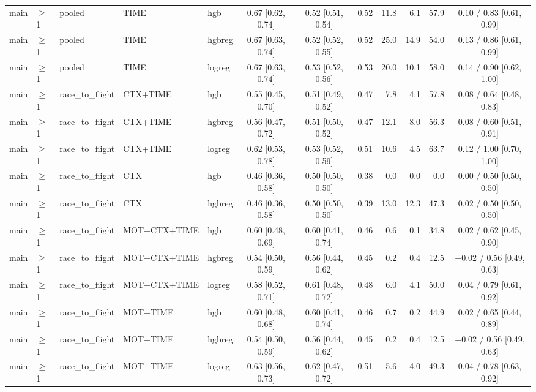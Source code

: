 \begin{longtable}{@{}lllllcccrrrc@{}}
main & $\geq$1 & pooled & TIME & hgb & 0.67 [0.62, 0.74] & 0.52 [0.51, 0.54] & 0.52 & 11.8 & 6.1 & 57.9 & 0.10 / 0.83 [0.61, 0.99] \\
main & $\geq$1 & pooled & TIME & hgbreg & 0.67 [0.63, 0.74] & 0.52 [0.52, 0.55] & 0.52 & 25.0 & 14.9 & 54.0 & 0.13 / 0.86 [0.61, 0.99] \\
main & $\geq$1 & pooled & TIME & logreg & 0.67 [0.63, 0.74] & 0.53 [0.52, 0.56] & 0.53 & 20.0 & 10.1 & 58.0 & 0.14 / 0.90 [0.62, 1.00] \\
main & $\geq$1 & race\_to\_flight & CTX+TIME & hgb & 0.55 [0.45, 0.70] & 0.51 [0.49, 0.52] & 0.47 & 7.8 & 4.1 & 57.8 & 0.08 / 0.64 [0.48, 0.83] \\
main & $\geq$1 & race\_to\_flight & CTX+TIME & hgbreg & 0.56 [0.47, 0.72] & 0.51 [0.50, 0.52] & 0.47 & 12.1 & 8.0 & 56.3 & 0.08 / 0.60 [0.51, 0.91] \\
main & $\geq$1 & race\_to\_flight & CTX+TIME & logreg & 0.62 [0.53, 0.78] & 0.53 [0.52, 0.59] & 0.51 & 10.6 & 4.5 & 63.7 & 0.12 / 1.00 [0.70, 1.00] \\
main & $\geq$1 & race\_to\_flight & CTX & hgb & 0.46 [0.36, 0.58] & 0.50 [0.50, 0.50] & 0.38 & 0.0 & 0.0 & 0.0 & 0.00 / 0.50 [0.50, 0.50] \\
main & $\geq$1 & race\_to\_flight & CTX & hgbreg & 0.46 [0.36, 0.58] & 0.50 [0.50, 0.50] & 0.39 & 13.0 & 12.3 & 47.3 & 0.02 / 0.50 [0.50, 0.50] \\
main & $\geq$1 & race\_to\_flight & MOT+CTX+TIME & hgb & 0.60 [0.48, 0.69] & 0.60 [0.41, 0.74] & 0.46 & 0.6 & 0.1 & 34.8 & 0.02 / 0.62 [0.45, 0.90] \\
main & $\geq$1 & race\_to\_flight & MOT+CTX+TIME & hgbreg & 0.54 [0.50, 0.59] & 0.56 [0.44, 0.62] & 0.45 & 0.2 & 0.4 & 12.5 & $-$0.02 / 0.56 [0.49, 0.63] \\
main & $\geq$1 & race\_to\_flight & MOT+CTX+TIME & logreg & 0.58 [0.52, 0.71] & 0.61 [0.48, 0.72] & 0.48 & 6.0 & 4.1 & 50.0 & 0.04 / 0.79 [0.61, 0.92] \\
main & $\geq$1 & race\_to\_flight & MOT+TIME & hgb & 0.60 [0.48, 0.68] & 0.60 [0.41, 0.74] & 0.46 & 0.7 & 0.2 & 44.9 & 0.02 / 0.65 [0.44, 0.89] \\
main & $\geq$1 & race\_to\_flight & MOT+TIME & hgbreg & 0.54 [0.50, 0.59] & 0.56 [0.44, 0.62] & 0.45 & 0.2 & 0.4 & 12.5 & $-$0.02 / 0.56 [0.49, 0.63] \\
main & $\geq$1 & race\_to\_flight & MOT+TIME & logreg & 0.63 [0.56, 0.73] & 0.62 [0.47, 0.72] & 0.51 & 5.6 & 4.0 & 49.3 & 0.04 / 0.78 [0.63, 0.92] \\

\end{longtable}

